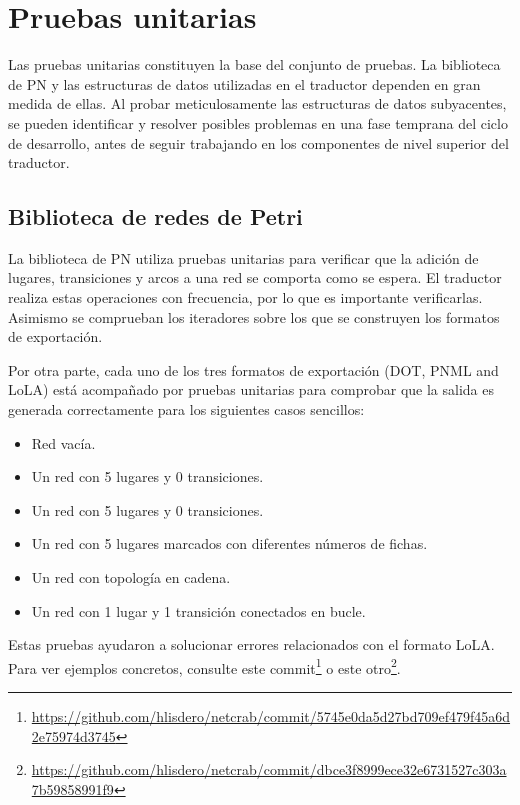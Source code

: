 \section{Pruebas unitarias}

Las pruebas unitarias constituyen la base del conjunto de pruebas. La biblioteca de \acrshort{PN} y las
estructuras de datos utilizadas en el traductor dependen en gran medida de ellas. Al probar
meticulosamente las estructuras de datos subyacentes, se pueden identificar y resolver posibles
problemas en una fase temprana del ciclo de desarrollo, antes de seguir trabajando en los
componentes de nivel superior del traductor.


\subsection{Biblioteca de redes de Petri}

La biblioteca de \acrshort{PN}  utiliza pruebas unitarias para verificar que
la adición de lugares, transiciones y arcos a una red se comporta como se espera.
El traductor realiza estas operaciones con frecuencia, por lo que es importante verificarlas.
Asimismo se comprueban los iteradores sobre los que se construyen los formatos de exportación.

Por otra parte, cada uno de los tres formatos de exportación (DOT, \acrshort{PNML} and \acrshort{LoLA})
está acompañado por pruebas unitarias para comprobar que la salida es generada correctamente para los siguientes
casos sencillos:

\begin{itemize}
  \item Red vacía.
  \item Un red con 5 lugares y 0 transiciones.
  \item Un red con 5 lugares y 0 transiciones.
  \item Un red con 5 lugares marcados con diferentes números de fichas.
  \item Un red con topología en cadena.
  \item Un red con 1 lugar y 1 transición conectados en bucle.
\end{itemize}

Estas pruebas ayudaron a solucionar errores relacionados con el formato LoLA. Para ver
ejemplos concretos, consulte este
commit\footnote{\url{https://github.com/hlisdero/netcrab/commit/5745e0da5d27bd709ef479f45a6d2e75974d3745}}
o este otro\footnote{\url{https://github.com/hlisdero/netcrab/commit/dbce3f8999ece32e6731527c303a7b59858991f9}}.

